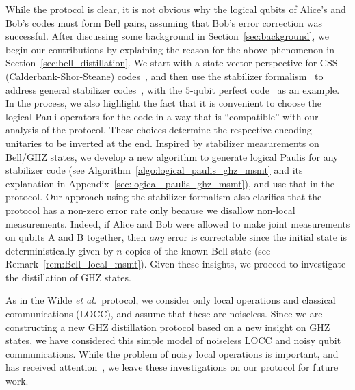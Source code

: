 \documentclass[journal,onecolumn]{IEEEtran}
\newcommand{\etal}{\emph{et al.~}}
\begin{document}
While the protocol is clear, it is not obvious why the logical qubits of Alice's and Bob's codes must form Bell pairs, assuming that Bob's error correction was successful.
After discussing some background in Section~\ref{sec:background}, we begin our contributions by explaining the reason for the above phenomenon in Section~\ref{sec:bell_distillation}.
We start with a state vector perspective for CSS (Calderbank-Shor-Steane) codes~\cite{Calderbank-physreva96,Steane-physreva96}, and then use the stabilizer formalism~\cite{Gottesman-icgtmp98} to address general stabilizer codes~\cite{Gottesman-phd97,Calderbank-it98}, with the $5$-qubit perfect code~\cite{Laflamme-prl96,Gottesman-phd97} as an example.
In the process, we also highlight the fact that it is convenient to choose the logical Pauli operators for the code in a way that is ``compatible'' with our analysis of the protocol.
These choices determine the respective encoding unitaries to be inverted at the end.
Inspired by stabilizer measurements on Bell/GHZ states, we develop a new algorithm to generate logical Paulis for any stabilizer code (see Algorithm~\ref{algo:logical_paulis_ghz_msmt} and its explanation in Appendix~\ref{sec:logical_paulis_ghz_msmt}), and use that in the protocol.
Our approach using the stabilizer formalism also clarifies that the protocol has a non-zero error rate only because we disallow non-local measurements.
Indeed, if Alice and Bob were allowed to make joint measurements on qubits A and B together, then \emph{any} error is correctable since the initial state is deterministically given by $n$ copies of the known Bell state (see Remark~\ref{rem:Bell_local_msmt}).
Given these insights, we proceed to investigate the distillation of GHZ states.

As in the Wilde \etal protocol, we consider only local operations and classical communications (LOCC), and assume that these are noiseless.
Since we are constructing a new GHZ distillation protocol based on a new insight on GHZ states, we have considered this simple model of noiseless LOCC and noisy qubit communications.
While the problem of noisy local operations is important, and has received attention~\cite{Pan-nature01,Dur-rpp07,Nickerson-ncomms13,Krastanov-quantum19}, we leave these investigations on our protocol for future work.
\end{document}
